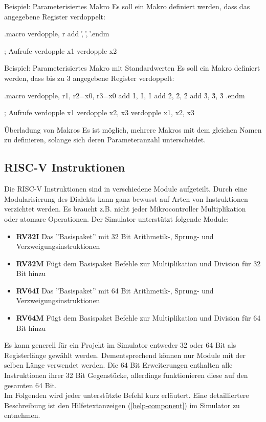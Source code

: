 \begin{exampleblock}{Beispiel: Parameterisiertes Makro}
	Es soll ein Makro definiert werden, dass das angegebene Register verdoppelt:
	\begin{riscv}
		.macro verdopple, r
		add \r, \r, \r
		.endm

		; Aufrufe
		verdopple x1
		verdopple x2
	\end{riscv}
\end{exampleblock}

\begin{exampleblock}{Beispiel: Parameterisiertes Makro mit Standardwerten}
	Es soll ein Makro definiert werden, dass bis zu 3 angegebene Register
	verdoppelt:
	\begin{riscv}
		.macro verdopple, r1, r2=x0, r3=x0
		add \r1, \r1, \r1
		add \r2, \r2, \r2
		add \r3, \r3, \r3
		.endm

		; Aufrufe
		verdopple x1
		verdopple x2, x3
		verdopple x1, x2, x3
	\end{riscv}
\end{exampleblock}

\begin{infoblock}{Überladung von Makros}
	Es ist möglich, mehrere Makros mit dem gleichen Namen zu definieren, solange
	sich deren Parameteranzahl unterscheidet.
\end{infoblock}

\subsection{RISC-V Instruktionen}
Die RISC-V Instruktionen sind in verschiedene Module aufgeteilt. Durch eine Modularisierung des Dialekts kann ganz bewusst auf Arten von Instruktionen verzichtet werden. Es braucht z.B. nicht jeder Mikrocontroller Multiplikation oder atomare Operationen. Der Simulator unterstützt folgende Module:\\
\begin{itemize}
	\item \textbf{RV32I} Das ''Basispaket'' mit 32 Bit Arithmetik-, Sprung- und Verzweigungsinstruktionen
	\item\textbf{ RV32M} Fügt dem Basispaket Befehle zur Multiplikation und Division für 32 Bit hinzu
	\item \textbf{RV64I} Das ''Basispaket'' mit 64 Bit Arithmetik-, Sprung- und Verzweigungsinstruktionen
	\item \textbf{RV64M} Fügt dem Basispaket Befehle zur Multiplikation und Division für 64 Bit hinzu
\end{itemize}
Es kann generell für ein Projekt im Simulator entweder 32 oder 64 Bit als Registerlänge gewählt werden. Dementsprechend können nur Module mit der selben Länge verwendet werden. Die 64 Bit Erweiterungen enthalten alle Instruktionen ihrer 32 Bit Gegenstücke, allerdings funktionieren diese auf den gesamten 64 Bit.\\
Im Folgenden wird jeder unterstützte Befehl kurz erläutert. Eine detailliertere Beschreibung ist den Hilfetextanzeigen (\autoref{help-component}) im Simulator zu entnehmen.\\

